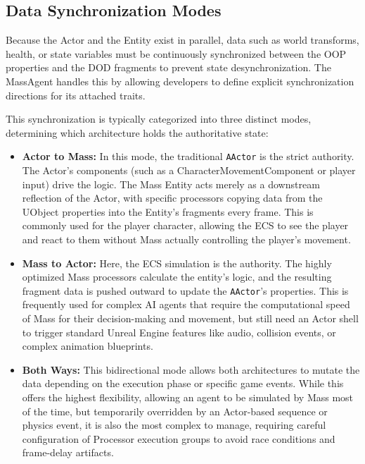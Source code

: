 \subsection{Data Synchronization Modes}

Because the Actor and the Entity exist in parallel, data such as world transforms, health, or state variables must be continuously synchronized between the OOP properties and the DOD fragments to prevent state desynchronization. The MassAgent handles this by allowing developers to define explicit synchronization directions for its attached traits.

This synchronization is typically categorized into three distinct modes, determining which architecture holds the authoritative state:

\begin{itemize}
    \item \textbf{Actor to Mass:} In this mode, the traditional \texttt{AActor} is the strict authority. The Actor's components (such as a CharacterMovementComponent or player input) drive the logic. The Mass Entity acts merely as a downstream reflection of the Actor, with specific processors copying data from the UObject properties into the Entity's fragments every frame. This is commonly used for the player character, allowing the ECS to see the player and react to them without Mass actually controlling the player's movement.
    \item \textbf{Mass to Actor:} Here, the ECS simulation is the authority. The highly optimized Mass processors calculate the entity's logic, and the resulting fragment data is pushed outward to update the \texttt{AActor}'s properties. This is frequently used for complex AI agents that require the computational speed of Mass for their decision-making and movement, but still need an Actor shell to trigger standard Unreal Engine features like audio, collision events, or complex animation blueprints.
    \item \textbf{Both Ways:} This bidirectional mode allows both architectures to mutate the data depending on the execution phase or specific game events. While this offers the highest flexibility, allowing an agent to be simulated by Mass most of the time, but temporarily overridden by an Actor-based sequence or physics event, it is also the most complex to manage, requiring careful configuration of Processor execution groups to avoid race conditions and frame-delay artifacts.
\end{itemize}

